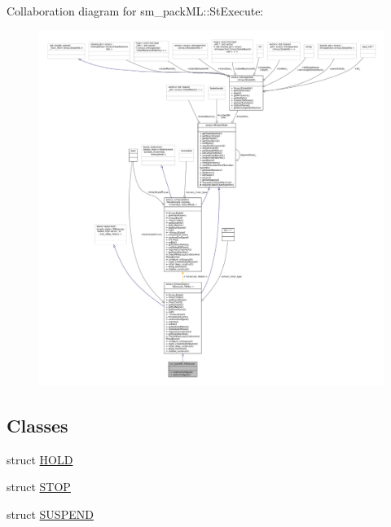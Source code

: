 Collaboration diagram for sm\+\_\+pack\+ML\+:\+:St\+Execute\+:
\nopagebreak
\begin{figure}[H]
\begin{center}
\leavevmode
\includegraphics[width=350pt]{structsm__packML_1_1StExecute__coll__graph}
\end{center}
\end{figure}
\subsection*{Classes}
\begin{DoxyCompactItemize}
\item 
struct \hyperlink{structsm__packML_1_1StExecute_1_1HOLD}{H\+O\+LD}
\item 
struct \hyperlink{structsm__packML_1_1StExecute_1_1STOP}{S\+T\+OP}
\item 
struct \hyperlink{structsm__packML_1_1StExecute_1_1SUSPEND}{S\+U\+S\+P\+E\+ND}
\end{DoxyCompactItemize}
